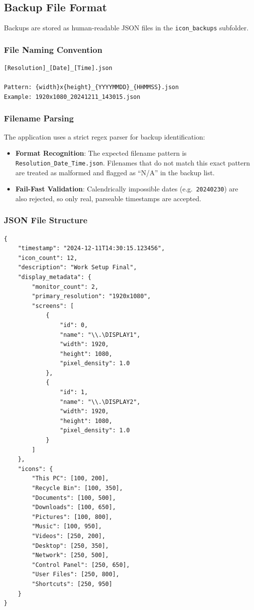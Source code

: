 \documentclass[a4paper,11pt]{article}
\begin{document}
\subsection{Backup File Format}

Backups are stored as human-readable JSON files in the
\texttt{icon\_backups} subfolder.

\subsubsection{File Naming Convention}

\begin{verbatim}
[Resolution]_[Date]_[Time].json

Pattern: {width}x{height}_{YYYYMMDD}_{HHMMSS}.json
Example: 1920x1080_20241211_143015.json
\end{verbatim}

\subsubsection{Filename Parsing}

The application uses a strict regex parser for backup identification:
\begin{itemize}
  \item \textbf{Format Recognition}: The expected filename pattern is
    \texttt{Resolution\_Date\_Time.json}. Filenames that do not match
    this exact pattern are treated as malformed and flagged as
    ``N/A'' in the backup list.
  \item \textbf{Fail-Fast Validation}: Calendrically impossible dates
    (e.g.\ \texttt{20240230}) are also rejected, so only real,
    parseable timestamps are accepted.
\end{itemize}

\subsubsection{JSON File Structure}

\begin{verbatim}
{
    "timestamp": "2024-12-11T14:30:15.123456",
    "icon_count": 12,
    "description": "Work Setup Final",
    "display_metadata": {
        "monitor_count": 2,
        "primary_resolution": "1920x1080",
        "screens": [
            {
                "id": 0,
                "name": "\\.\DISPLAY1",
                "width": 1920,
                "height": 1080,
                "pixel_density": 1.0
            },
            {
                "id": 1,
                "name": "\\.\DISPLAY2",
                "width": 1920,
                "height": 1080,
                "pixel_density": 1.0
            }
        ]
    },
    "icons": {
        "This PC": [100, 200],
        "Recycle Bin": [100, 350],
        "Documents": [100, 500],
        "Downloads": [100, 650],
        "Pictures": [100, 800],
        "Music": [100, 950],
        "Videos": [250, 200],
        "Desktop": [250, 350],
        "Network": [250, 500],
        "Control Panel": [250, 650],
        "User Files": [250, 800],
        "Shortcuts": [250, 950]
    }
}
\end{verbatim}
\end{document}
